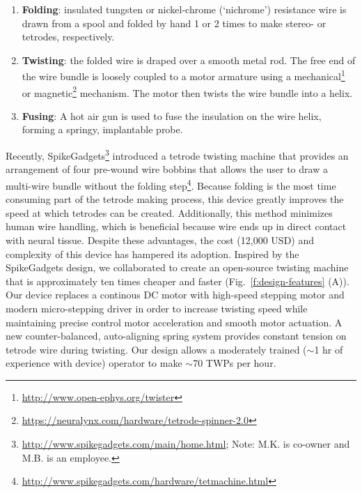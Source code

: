 \documentclass[11pt,a4paper]{article}
\begin{document}
\begin{enumerate}
    \item \textbf{Folding}: insulated tungsten or nickel-chrome (`nichrome')
        resistance wire is drawn from a spool and folded by hand 1 or 2 times
        to make stereo- or tetrodes, respectively.
    \item \textbf{Twisting}: the folded wire is draped over a smooth metal rod.
        The free end of the wire bundle is loosely coupled to a motor armature
        using a mechanical\footnote{\url{http://www.open-ephys.org/twister}} or
        magnetic\footnote{\url{https://neuralynx.com/hardware/tetrode-spinner-2.0}}
        mechanism. The motor then twists the wire bundle into a helix.
    \item \textbf{Fusing}: A hot air gun is used to fuse the insulation
        on the wire helix, forming a springy, implantable probe.
\end{enumerate}

Recently,
SpikeGadgets\footnote{\url{http://www.spikegadgets.com/main/home.html}; Note:
M.K. is co-owner and M.B. is an employee.} introduced a tetrode twisting
machine that provides an arrangement of four pre-wound wire bobbins that allows
the user to draw a multi-wire bundle without the folding
step\footnote{\url{http://www.spikegadgets.com/hardware/tetmachine.html}}.
Because folding is the most time consuming part of the tetrode making process,
this device greatly improves the speed at which tetrodes can be created.
Additionally, this method minimizes human wire handling, which is beneficial
because wire ends up in direct contact with neural tissue. Despite these
advantages, the cost (12,000 USD) and complexity of this device has hampered
its adoption. Inspired by the SpikeGadgets design, we collaborated to create an
open-source twisting machine that is approximately ten times cheaper and faster
(Fig.~\ref{f:design-features} (A)). Our device replaces a continous DC motor
with high-speed stepping motor and modern micro-stepping driver in order to
increase twisting speed while maintaining precise control motor acceleration
and smooth motor actuation. A new counter-balanced, auto-aligning spring system
provides constant tension on tetrode wire during twisting. Our design allows a
moderately trained ($\sim$1 hr of experience with device) operator to make
$\sim$70 TWPs per hour.
\end{document}
